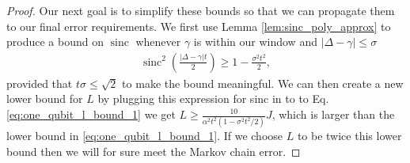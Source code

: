 \documentclass{article}
\DeclareMathOperator{\sinc}{sinc}
\begin{document}
\begin{proof}
 Our next goal is to simplify these bounds so that we can propagate them to our final error requirements. We first use Lemma \ref{lem:sinc_poly_approx} to produce a  bound on $\sinc$ whenever $\gamma$ is within our window and $|\Delta - \gamma| \le \sigma$
 \begin{align}
     \sinc^2\left( \frac{|\Delta - \gamma| t}{2} \right) \ge 1 - \frac{\sigma^2 t^2}{2},
 \end{align}
 provided that $t \sigma \le \sqrt{2}$ to make the bound meaningful. We can then create a new lower bound for $L$ by plugging this expression for sinc in to to Eq. \eqref{eq:one_qubit_l_bound_1} we get $L \ge \frac{10}{\alpha^2 t^2(1 - \sigma^2 t^2 / 2)} J$, which is larger than the lower bound in \eqref{eq:one_qubit_l_bound_1}. If we choose $L$ to be twice this lower bound then we will for sure meet the Markov chain error. 
 

\end{proof}
\end{document}
